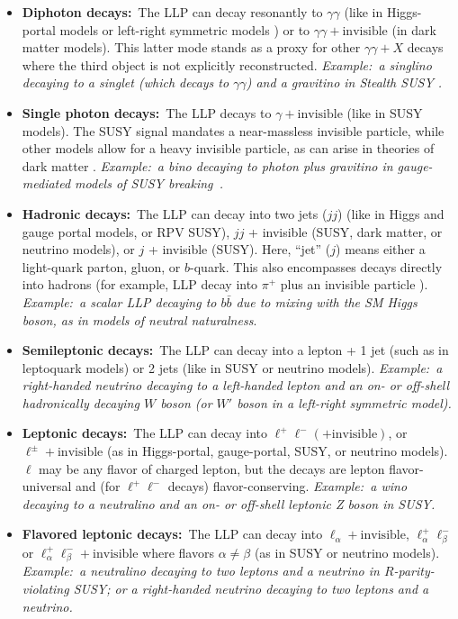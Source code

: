 \begin{itemize}
\item {\bf Diphoton decays:}~The LLP can decay resonantly to
  $\gamma\gamma$ (like in Higgs-portal models or left-right symmetric models
  \cite{Dev:2016vle}) or to
  $\gamma\gamma+\mathrm{invisible}$ (in dark matter models). This
  latter mode stands as a proxy for other $\gamma\gamma+X$ decays
  where the third object is not explicitly reconstructed. \emph{Example:~a 
  singlino decaying to a singlet (which decays to $\gamma\gamma$) and 
  a gravitino in Stealth SUSY \cite{Fan:2011yu}.}

\item {\bf Single photon decays:}~The LLP decays to
  $\gamma+\mathrm{invisible}$ (like in SUSY models).  The SUSY signal mandates a
  near-massless invisible particle, while other models allow for
  a heavy invisible particle, as can arise in theories of dark matter
  \cite{Weiner:2012cb,Primulando:2015lfa}. \emph{Example:~a bino decaying to photon plus gravitino in gauge-mediated
  models of SUSY breaking~\cite{Dimopoulos:1996yq}.}

\item {\bf Hadronic decays:}~The LLP can decay into two jets ($jj$)
  (like in Higgs and gauge portal models, or RPV SUSY), $jj$ +
  invisible (SUSY, dark matter, or neutrino models), or $j$ +
  invisible (SUSY). Here, ``jet'' ($j$) means either a light-quark parton,
  gluon, or $b$-quark. This also encompasses decays directly into
  hadrons (for example, LLP decay into $\pi^+$ plus an invisible 
  particle  \cite{Chen:1995yu,Thomas:1998wy,Feng:1999fu}).
   \emph{Example:~a scalar LLP decaying to $b\bar{b}$
  due to mixing with the SM Higgs boson, as in models of
  neutral naturalness}. 

\item {\bf Semileptonic decays:}~The LLP can decay into a lepton + 1 jet (such as in leptoquark models)
  or 2 jets (like in SUSY or neutrino models). \emph{Example:~a right-handed neutrino decaying to a left-handed
   lepton and an on- or off-shell hadronically decaying $W$ boson (or $W'$ boson in a left-right
   symmetric model). }

\item {\bf Leptonic decays:}~The LLP can decay into
  $\ell^+\ell^-(+\mathrm{invisible})$, or
  $\ell^\pm+\mathrm{invisible}$ (as in Higgs-portal, gauge-portal,
  SUSY, or neutrino models). $\ell$ may be any flavor of charged
  lepton, but the decays are lepton flavor-universal and (for
  $\ell^+\ell^-$ decays) flavor-conserving. \emph{Example:~a wino decaying
  to a neutralino and an on- or off-shell leptonic Z boson in SUSY.}

\item {\bf Flavored leptonic decays:}~The LLP can decay into
  $\ell_\alpha+\mathrm{invisible}$, $\ell_\alpha^+\ell_\beta^-$ or
  $\ell_\alpha^+\ell_\beta^-+\mathrm{invisible}$ where flavors
  $\alpha\neq\beta$ (as in SUSY or neutrino models). \emph{Example:~a neutralino decaying to two
   leptons and a neutrino in $R$-parity-violating SUSY; or a right-handed neutrino decaying to 
   two leptons and a neutrino.}
\end{itemize}


